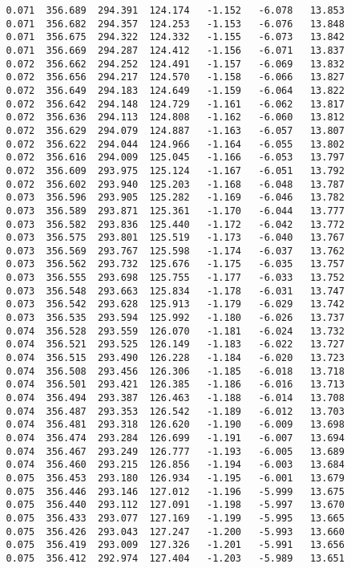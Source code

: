 \begin{verbatim}
   0.071  356.689  294.391  124.174   -1.152   -6.078   13.853
   0.071  356.682  294.357  124.253   -1.153   -6.076   13.848
   0.071  356.675  294.322  124.332   -1.155   -6.073   13.842
   0.071  356.669  294.287  124.412   -1.156   -6.071   13.837
   0.072  356.662  294.252  124.491   -1.157   -6.069   13.832
   0.072  356.656  294.217  124.570   -1.158   -6.066   13.827
   0.072  356.649  294.183  124.649   -1.159   -6.064   13.822
   0.072  356.642  294.148  124.729   -1.161   -6.062   13.817
   0.072  356.636  294.113  124.808   -1.162   -6.060   13.812
   0.072  356.629  294.079  124.887   -1.163   -6.057   13.807
   0.072  356.622  294.044  124.966   -1.164   -6.055   13.802
   0.072  356.616  294.009  125.045   -1.166   -6.053   13.797
   0.072  356.609  293.975  125.124   -1.167   -6.051   13.792
   0.072  356.602  293.940  125.203   -1.168   -6.048   13.787
   0.073  356.596  293.905  125.282   -1.169   -6.046   13.782
   0.073  356.589  293.871  125.361   -1.170   -6.044   13.777
   0.073  356.582  293.836  125.440   -1.172   -6.042   13.772
   0.073  356.575  293.801  125.519   -1.173   -6.040   13.767
   0.073  356.569  293.767  125.598   -1.174   -6.037   13.762
   0.073  356.562  293.732  125.676   -1.175   -6.035   13.757
   0.073  356.555  293.698  125.755   -1.177   -6.033   13.752
   0.073  356.548  293.663  125.834   -1.178   -6.031   13.747
   0.073  356.542  293.628  125.913   -1.179   -6.029   13.742
   0.073  356.535  293.594  125.992   -1.180   -6.026   13.737
   0.074  356.528  293.559  126.070   -1.181   -6.024   13.732
   0.074  356.521  293.525  126.149   -1.183   -6.022   13.727
   0.074  356.515  293.490  126.228   -1.184   -6.020   13.723
   0.074  356.508  293.456  126.306   -1.185   -6.018   13.718
   0.074  356.501  293.421  126.385   -1.186   -6.016   13.713
   0.074  356.494  293.387  126.463   -1.188   -6.014   13.708
   0.074  356.487  293.353  126.542   -1.189   -6.012   13.703
   0.074  356.481  293.318  126.620   -1.190   -6.009   13.698
   0.074  356.474  293.284  126.699   -1.191   -6.007   13.694
   0.074  356.467  293.249  126.777   -1.193   -6.005   13.689
   0.074  356.460  293.215  126.856   -1.194   -6.003   13.684
   0.075  356.453  293.180  126.934   -1.195   -6.001   13.679
   0.075  356.446  293.146  127.012   -1.196   -5.999   13.675
   0.075  356.440  293.112  127.091   -1.198   -5.997   13.670
   0.075  356.433  293.077  127.169   -1.199   -5.995   13.665
   0.075  356.426  293.043  127.247   -1.200   -5.993   13.660
   0.075  356.419  293.009  127.326   -1.201   -5.991   13.656
   0.075  356.412  292.974  127.404   -1.203   -5.989   13.651

\end{verbatim}
